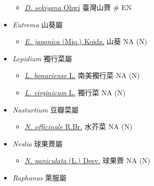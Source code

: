 \begin{itemize}
  \begin{itemize}
        \item[] \href{http://www.theplantlist.org/tpl1.1/search?q=Draba+sekiyana}{\textit{D. sekiyana} Ohwi}   臺灣山薺  \# EN
  \end{itemize}
 \item[] \textit{Eutrema} 山葵屬
                                
  \begin{itemize}
        \item[] \href{http://www.theplantlist.org/tpl1.1/search?q=Eutrema+japonica}{\textit{E. japonica} (Miq.) Koidz.}   山葵   NA (N)
  \end{itemize}
 \item[] \textit{Lepidium} 獨行菜屬
                                
  \begin{itemize}
        \item[] \href{http://www.theplantlist.org/tpl1.1/search?q=Lepidium+bonariense}{\textit{L. bonariense} L.}   南美獨行菜   NA (N)
        \item[] \href{http://www.theplantlist.org/tpl1.1/search?q=Lepidium+virginicum}{\textit{L. virginicum} L.}   獨行菜   NA (N)
  \end{itemize}
 \item[] \textit{Nasturtium} 豆瓣菜屬
                                
  \begin{itemize}
        \item[] \href{http://www.theplantlist.org/tpl1.1/search?q=Nasturtium+officinale}{\textit{N. officinale} R.Br.}   水芥菜   NA (N)
  \end{itemize}
 \item[] \textit{Neslia} 球果薺屬
                                
  \begin{itemize}
        \item[] \href{http://www.theplantlist.org/tpl1.1/search?q=Neslia+paniculata}{\textit{N. paniculata} (L.) Desv.}   球果薺   NA (N)
  \end{itemize}
 \item[] \textit{Raphanus} 萊服屬
                                

\end{itemize}
